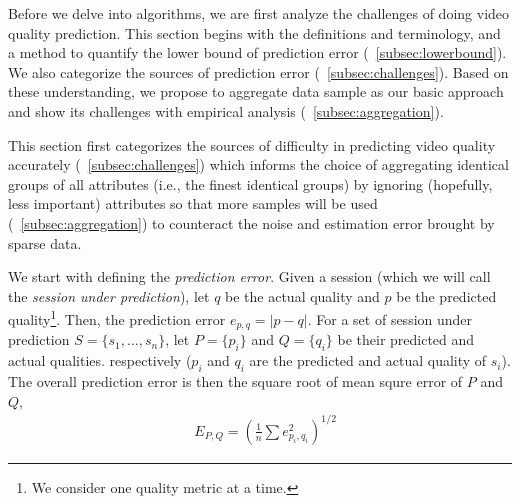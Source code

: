 \label{sec:challenges}


Before we delve into algorithms, we are first analyze the challenges of doing video quality prediction. This section begins with the definitions and terminology, and a method to quantify the lower bound of prediction error (\Section~\ref{subsec:lowerbound}). We also categorize the sources of prediction error (\Section~\ref{subsec:challenges}). Based on these understanding, we propose to aggregate data sample as our basic approach and show its challenges with empirical analysis (\Section~\ref{subsec:aggregation}).


This section first categorizes the sources of difficulty in predicting video quality accurately (\Section~\ref{subsec:challenges}) which informs the choice of aggregating identical groups of all attributes (i.e., the finest identical groups) by ignoring (hopefully, less important) attributes so that more samples will be used (\Section~\ref{subsec:aggregation}) to counteract the noise and estimation error brought by sparse data.


\label{subsec:lowerbound}


 We start with defining the {\it prediction error}.  Given a session
(which we will call the {\it session under prediction}), let $q$ be
the actual quality and $p$ be the predicted quality\footnote{We consider one quality metric at a time.}. Then, the
prediction error $e_{p,q}=|p-q|$.
For a set of session under prediction $S=\{s_1,\dots,s_n\}$, let $P=\{p_i\}$ and $Q=\{q_i\}$ be their predicted and actual qualities. respectively ($p_i$ and $q_i$ are the predicted and actual quality of $s_i$). The overall prediction error is then the square root of mean squre error of $P$ and $Q$, 
\begin{align}
&E_{P,Q}=\left(\frac{1}{n}\sum e_{p_i,q_i}^2\right)^{1/2}
\end{align}


